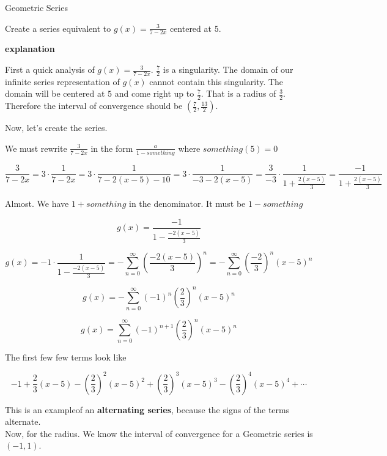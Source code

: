 \documentclass{ximera}
\begin{document}
\begin{example} Geometric Series



Create a series equivalent to $g(x)=\frac{3}{7 - 2x}$ centered at $5$.



\textbf{\textcolor{purple!50!blue!90!black}{explanation}}


First a quick analysis of $g(x)=\frac{3}{7 - 2x}$.  $\frac{7}{2}$ is a singularity. The domain of our infinite series representation of $g(x)$ cannot contain this singularity.  The domain will be centered at $5$ and come right up to $\frac{7}{2}$.  That is a radius of $\frac{3}{2}$. Therefore the interval of convergence should be $\left( \frac{7}{2}, \frac{13}{2} \right)$.

Now, let's create the series.

We must rewrite $\frac{3}{7 - 2x}$ in the form $\frac{a}{1-something}$ where $something(5) = 0$



\[      \frac{3}{7 - 2x}  = 3   \cdot \frac{1}{7 - 2x} =    3   \cdot \frac{1}{7 - 2(x-5) - 10} =   3   \cdot \frac{1}{-3 - 2(x-5)}   =   \frac{3}{-3}   \cdot \frac{1}{1 + \frac{2(x-5)}{3}}  = \frac{-1}{1 + \frac{2(x-5)}{3}}  \]



Almost.  We have $1 + something$ in the denominator. It must be $1 - something$


\[    g(x) =   \frac{-1}{1 - \frac{-2(x-5)}{3}}       \]

\[  g(x) =    -1 \cdot \frac{1}{1 - \frac{-2(x-5)}{3}}     =   -   \sum_{n=0}^{\infty}   \left( \frac{-2(x-5)}{3} \right)^n     =   -  \sum_{n=0}^{\infty}   \left( \frac{-2}{3} \right)^n  (x-5)^n\]


\[  g(x)     =   -  \sum_{n=0}^{\infty}   (-1)^n \left( \frac{2}{3} \right)^n  (x-5)^n    \]

\[  g(x)     =    \sum_{n=0}^{\infty}   (-1)^{n+1} \left( \frac{2}{3} \right)^n  (x-5)^n    \]

The first few few terms look like


\[   -1 + \frac{2}{3} (x-5) - \left( \frac{2}{3} \right)^2 (x-5)^2 +  \left( \frac{2}{3} \right)^3 (x-5)^3 - \left( \frac{2}{3} \right)^4 (x-5)^4    + \cdots   \]


This is an exampleof an \textbf{alternating series}, because the signs of the terms alternate. \\

Now, for the radius.  We know the interval of convergence for a Geometric series is $(-1, 1)$.



\end{example}
\end{document}
